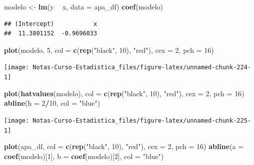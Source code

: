 \documentclass[
  12pt,
]{book}
\newenvironment{Shaded}{\begin{snugshade}}{\end{snugshade}}
\newcommand{\DataTypeTok}[1]{\textcolor[rgb]{0.13,0.29,0.53}{#1}}
\newcommand{\DecValTok}[1]{\textcolor[rgb]{0.00,0.00,0.81}{#1}}
\newcommand{\KeywordTok}[1]{\textcolor[rgb]{0.13,0.29,0.53}{\textbf{#1}}}
\newcommand{\NormalTok}[1]{#1}
\newcommand{\OperatorTok}[1]{\textcolor[rgb]{0.81,0.36,0.00}{\textbf{#1}}}
\newcommand{\StringTok}[1]{\textcolor[rgb]{0.31,0.60,0.02}{#1}}
\theoremstyle{definition}
\theoremstyle{definition}
\theoremstyle{definition}
\theoremstyle{remark}
\begin{document}
\begin{Shaded}
\begin{Highlighting}[]
\NormalTok{modelo <-}\StringTok{ }\KeywordTok{lm}\NormalTok{(y }\OperatorTok{~}\StringTok{ }\NormalTok{x, }\DataTypeTok{data =}\NormalTok{ apa_df)}
\KeywordTok{coef}\NormalTok{(modelo)}
\end{Highlighting}
\end{Shaded}

\begin{verbatim}
## (Intercept)           x 
##  11.3801152  -0.9696033
\end{verbatim}

\begin{Shaded}
\begin{Highlighting}[]
\KeywordTok{plot}\NormalTok{(modelo, }\DecValTok{5}\NormalTok{, }\DataTypeTok{col =} \KeywordTok{c}\NormalTok{(}\KeywordTok{rep}\NormalTok{(}\StringTok{"black"}\NormalTok{, }\DecValTok{10}\NormalTok{), }\StringTok{"red"}\NormalTok{), }\DataTypeTok{cex =} \DecValTok{2}\NormalTok{, }
    \DataTypeTok{pch =} \DecValTok{16}\NormalTok{)}
\end{Highlighting}
\end{Shaded}

\begin{center}\texttt{[image: Notas-Curso-Estadistica\_files/figure-latex/unnamed-chunk-224-1]} \end{center}

\begin{Shaded}
\begin{Highlighting}[]
\KeywordTok{plot}\NormalTok{(}\KeywordTok{hatvalues}\NormalTok{(modelo), }\DataTypeTok{col =} \KeywordTok{c}\NormalTok{(}\KeywordTok{rep}\NormalTok{(}\StringTok{"black"}\NormalTok{, }\DecValTok{10}\NormalTok{), }\StringTok{"red"}\NormalTok{), }
    \DataTypeTok{cex =} \DecValTok{2}\NormalTok{, }\DataTypeTok{pch =} \DecValTok{16}\NormalTok{)}
\KeywordTok{abline}\NormalTok{(}\DataTypeTok{h =} \DecValTok{2}\OperatorTok{/}\DecValTok{10}\NormalTok{, }\DataTypeTok{col =} \StringTok{"blue"}\NormalTok{)}
\end{Highlighting}
\end{Shaded}

\begin{center}\texttt{[image: Notas-Curso-Estadistica\_files/figure-latex/unnamed-chunk-225-1]} \end{center}

\begin{Shaded}
\begin{Highlighting}[]
\KeywordTok{plot}\NormalTok{(apa_df, }\DataTypeTok{col =} \KeywordTok{c}\NormalTok{(}\KeywordTok{rep}\NormalTok{(}\StringTok{"black"}\NormalTok{, }\DecValTok{10}\NormalTok{), }\StringTok{"red"}\NormalTok{), }\DataTypeTok{cex =} \DecValTok{2}\NormalTok{, }
    \DataTypeTok{pch =} \DecValTok{16}\NormalTok{)}
\KeywordTok{abline}\NormalTok{(}\DataTypeTok{a =} \KeywordTok{coef}\NormalTok{(modelo)[}\DecValTok{1}\NormalTok{], }\DataTypeTok{b =} \KeywordTok{coef}\NormalTok{(modelo)[}\DecValTok{2}\NormalTok{], }\DataTypeTok{col =} \StringTok{"blue"}\NormalTok{)}
\end{Highlighting}
\end{Shaded}
\end{document}

